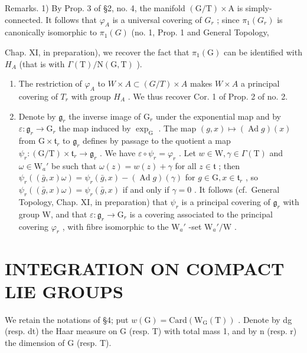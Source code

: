 Remarks. 1) By Prop. 3 of §2, no. 4, the manifold \((\mathrm{G}/\mathrm{T}) \times \mathrm{A}\) is simply-connected. It follows that \(\varphi_{A}\) is a universal covering of \(G_{r}\) ; since \(\pi_{1}(G_{r})\) is canonically isomorphic to \(\pi_{1}(G)\) (no. 1, Prop. 1 and General Topology,

Chap. XI, in preparation), we recover the fact that \(\pi_{1}(\mathrm{G})\) can be identified with \(H_{A}\) (that is with \(\Gamma(\mathrm{T})/\mathrm{N}(\mathrm{G},\mathrm{T})\) ).

\begin{enumerate}
\def\labelenumi{\arabic{enumi})}
\setcounter{enumi}{1}
\item
  The restriction of \(\varphi_{A}\) to \(W \times A \subset (G/T) \times A\) makes \(W \times A\) a principal covering of \(T_{r}\) with group \(H_{A}\) . We thus recover Cor. 1 of Prop. 2 of no. 2.
\item
  Denote by \(\mathfrak{g}_r\) the inverse image of \(\mathrm{G}_r\) under the exponential map and by \(\varepsilon : \mathfrak{g}_r \to \mathrm{G}_r\) the map induced by \(\exp_{\mathrm{G}}\) . The map \((g, x) \mapsto (\operatorname{Ad} g)(x)\) from \(\mathrm{G} \times \mathfrak{t}_r\) to \(\mathfrak{g}_r\) defines by passage to the quotient a map \(\psi_r : (\mathrm{G} / \mathrm{T}) \times \mathfrak{t}_r \to \mathfrak{g}_r\) . We have \(\varepsilon \circ \psi_r = \varphi_r\) . Let \(w \in \mathrm{W}, \gamma \in \Gamma(\mathrm{T})\) and \(\omega \in \mathrm{W}_a'\) be such that \(\omega(z) = w(z) + \gamma\) for all \(z \in \mathfrak{t}\) ; then \(\psi_r((\bar{g}, x)\omega) = \psi_r(\bar{g}, x) - (\operatorname{Ad} g)(\gamma)\) for \(g \in \mathrm{G}, x \in \mathfrak{t}_r\) , so \(\psi_r((\bar{g}, x)\omega) = \psi_r(\bar{g}, x)\) if and only if \(\gamma = 0\) . It follows (cf.~General Topology, Chap. XI, in preparation) that \(\psi_r\) is a principal covering of \(\mathfrak{g}_r\) with group W, and that \(\varepsilon : \mathfrak{g}_r \to \mathrm{G}_r\) is a covering associated to the principal covering \(\varphi_r\) , with fibre isomorphic to the \(\mathrm{W}_a'\) -set \(\mathrm{W}_a'/\mathrm{W}\) .
\end{enumerate}

\section{INTEGRATION ON COMPACT LIE GROUPS}

We retain the notations of §4; put \(w(\mathrm{G}) = \mathrm{Card}(\mathrm{W}_{\mathrm{G}}(\mathrm{T}))\) . Denote by dg (resp. dt) the Haar measure on G (resp. T) with total mass 1, and by n (resp. r) the dimension of G (resp. T).


